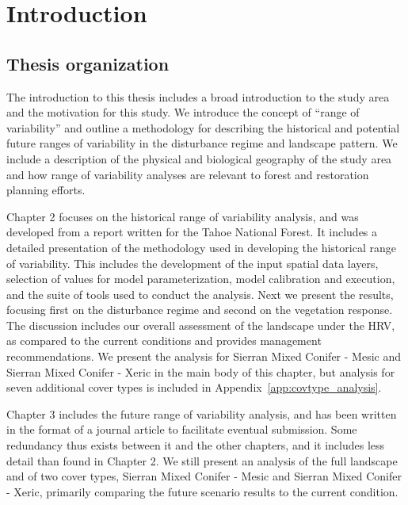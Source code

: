
\chapter{Introduction} %
\label{CH1}

\section{Thesis organization}

The introduction to this thesis includes a broad introduction to the study area and the motivation for this study. We introduce the concept of ``range of variability'' and outline a methodology for describing the historical and potential future ranges of variability in the disturbance regime and landscape pattern. We include a description of the physical and biological geography of the study area and how range of variability analyses are relevant to forest and restoration planning efforts. 

Chapter 2 focuses on the historical range of variability analysis, and was developed from a report written for the Tahoe National Forest. It includes a detailed presentation of the methodology used in developing the historical range of variability. This includes the development of the input spatial data layers, selection of values for model parameterization, model calibration and execution, and the suite of tools used to conduct the analysis. Next we present the results, focusing first on the disturbance regime and second on the vegetation response. The discussion includes our overall assessment of the landscape under the HRV, as compared to the current conditions and provides management recommendations. We present the analysis for Sierran Mixed Conifer - Mesic and Sierran Mixed Conifer - Xeric in the main body of this chapter, but analysis for seven additional cover types is included in Appendix~\ref{app:covtype_analysis}.

Chapter 3 includes the future range of variability analysis, and has been written in the format of a journal article to facilitate eventual submission. Some redundancy thus exists between it and the other chapters, and it includes less detail than found in Chapter 2. We still present an analysis of the full landscape and of two cover types, Sierran Mixed Conifer - Mesic and Sierran Mixed Conifer - Xeric, primarily comparing the future scenario results to the current condition.





